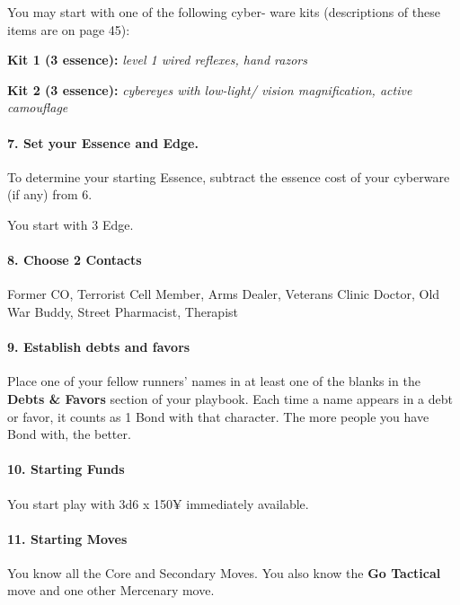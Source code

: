 \begin{multicols}{3}
You may start with one of the following cyber-
ware kits (descriptions of these items are on
page 45):

\textbf{Kit 1 (3 essence):} \textit{level 1 wired reflexes, hand
razors}

\textbf{Kit 2 (3 essence):} \textit{cybereyes with low-light/
vision magnification, active camouflage}


\paragraph{7.  Set your Essence and Edge.}

To determine your starting Essence, subtract the
essence cost of your cyberware (if any) from 6.

You start with 3 Edge.

\paragraph{8.  Choose 2 Contacts}

Former CO, Terrorist Cell Member, Arms Dealer,
Veterans Clinic Doctor, Old War Buddy, Street
Pharmacist, Therapist


\paragraph{9.  Establish debts and favors}

Place one of your fellow runners’ names in at
least one of the blanks in the \textbf{Debts \& Favors}
section of your playbook. Each time a name
appears in a debt or favor, it counts as 1 Bond
with that character. The more people you have
Bond with, the better.

\paragraph{10.  Starting Funds}

You start play with 3d6 x 150¥ immediately
available.

\paragraph{11.  Starting Moves}

You know all the Core and Secondary Moves.
You also know the \textbf{Go Tactical} move and
one other Mercenary move.

\end{multicols}


